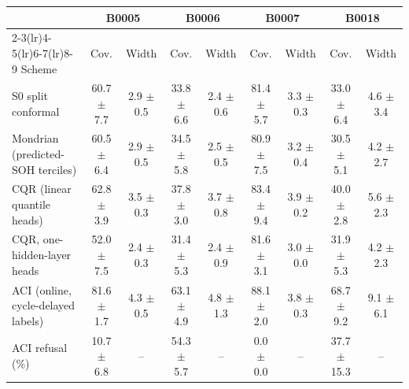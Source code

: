 \begin{tabular}{lcccccccc}
\toprule
& \multicolumn{2}{c}{B0005} & \multicolumn{2}{c}{B0006} & \multicolumn{2}{c}{B0007} & \multicolumn{2}{c}{B0018} \\
\cmidrule(lr){2-3}\cmidrule(lr){4-5}\cmidrule(lr){6-7}\cmidrule(lr){8-9}
Scheme & Cov. & Width & Cov. & Width & Cov. & Width & Cov. & Width \\
\midrule
S0 split conformal & 60.7 $\pm$ 7.7 & 2.9 $\pm$ 0.5 & 33.8 $\pm$ 6.6 & 2.4 $\pm$ 0.6 & 81.4 $\pm$ 5.7 & 3.3 $\pm$ 0.3 & 33.0 $\pm$ 6.4 & 4.6 $\pm$ 3.4 \\
Mondrian (predicted-SOH terciles) & 60.5 $\pm$ 6.4 & 2.9 $\pm$ 0.5 & 34.5 $\pm$ 5.8 & 2.5 $\pm$ 0.5 & 80.9 $\pm$ 7.5 & 3.2 $\pm$ 0.4 & 30.5 $\pm$ 5.1 & 4.2 $\pm$ 2.7 \\
CQR (linear quantile heads) & 62.8 $\pm$ 3.9 & 3.5 $\pm$ 0.3 & 37.8 $\pm$ 3.0 & 3.7 $\pm$ 0.8 & 83.4 $\pm$ 9.4 & 3.9 $\pm$ 0.2 & 40.0 $\pm$ 2.8 & 5.6 $\pm$ 2.3 \\
\quad CQR, one-hidden-layer heads & 52.0 $\pm$ 7.5 & 2.4 $\pm$ 0.3 & 31.4 $\pm$ 5.3 & 2.4 $\pm$ 0.9 & 81.6 $\pm$ 3.1 & 3.0 $\pm$ 0.0 & 31.9 $\pm$ 5.3 & 4.2 $\pm$ 2.3 \\
ACI (online, cycle-delayed labels) & 81.6 $\pm$ 1.7 & 4.3 $\pm$ 0.5 & 63.1 $\pm$ 4.9 & 4.8 $\pm$ 1.3 & 88.1 $\pm$ 2.0 & 3.8 $\pm$ 0.3 & 68.7 $\pm$ 9.2 & 9.1 $\pm$ 6.1 \\
\quad ACI refusal (\%) & 10.7 $\pm$ 6.8 & -- & 54.3 $\pm$ 5.7 & -- & 0.0 $\pm$ 0.0 & -- & 37.7 $\pm$ 15.3 & -- \\
\bottomrule
\end{tabular}
